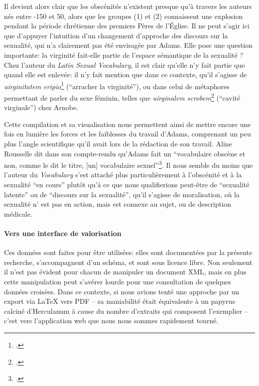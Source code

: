 Il devient alors clair que les obscénités n'existent presque qu'à travers les auteurs nés entre -150 et 50, alors que les groupes (1) et (2) connaissent une explosion pendant la période chrétienne des premiers Pères de l'Église. Il ne peut s'agir ici que d'appuyer l'intuition d'un changement d'approche des discours sur la sexualité, qui n'a clairement pas été envisagée par Adams. Elle pose une question importante: la virginité fait-elle partie de l'espace sémantique de la sexualité ? Chez l'auteur du \textit{Latin Sexual Vocabulary}, il est clair qu'elle n'y fait partie que quand elle est enlevée: il n'y fait mention que dans ce contexte, qu'il s'agisse de \textit{uirginitatem eripio}\footcite[p.~195]{adams} (\enquote{arracher la virginité}), ou dans celui de métaphores permettant de parler du sexe féminin, telles que \textit{uirginalem scrobem}\footcite[p.~151]{adams} (\enquote{cavité virginale}) chez Arnobe.

Cette compilation et sa visualisation nous permettent ainsi de mettre encore une fois en lumière les forces et les faiblesses du travail d'Adams, comprenant un peu plus l'angle scientifique qu'il avait lors de la rédaction de son travail. Aline Rousselle dit dans son compte-rendu qu'Adams fait un \enquote{vocabulaire obscène et non, comme le dit le titre, [un] vocabulaire sexuel}\footcite{rousselle_j_1987}. Il nous semble du moins que l'auteur du \textit{Vocabulary} s'est attaché plus particulièrement à l'obscénité et à la sexualité \enquote{en cours} plutôt qu'à ce que nous qualifierions peut-être de \enquote{sexualité latente} ou de \enquote{discours sur la sexualité}, qu'il s'agisse de moralisation, où la sexualité n' est pas en action, mais est connexe au sujet, ou de description médicale.

\paragraph{Vers une interface de valorisation}

Ces données sont faites pour être utilisées: elles sont documentées par la présente recherche, s'accompagnent d'un schéma, et sont sous licence libre. Non seulement il n'est pas évident pour chacun de manipuler un document XML, mais en plus cette manipulation peut s'avérer lourde pour une consultation de quelques données croisées. Dans ce contexte, si nous avions tenté une approche par un export via LaTeX vers PDF -- sa maniabilité était équivalente à un papyrus calciné d'Herculanum à cause du nombre d'extraits qui composent l'exemplier -- c'est vers l'application web que nous nous sommes rapidement tourné.

